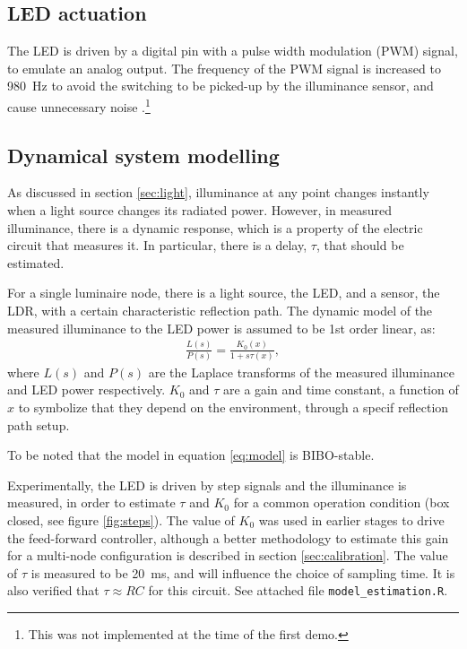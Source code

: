 \documentclass[english,fira]{ist-report}
\begin{document}
\subsection{LED actuation}

The LED is driven by a digital pin with a pulse width modulation (PWM) signal, to emulate an analog output.
The frequency of the PWM signal is increased to \SI{980}{\hertz} to avoid the switching to be picked-up by the illuminance sensor, and cause unnecessary noise \cite{pwm-guide}.\footnote{This was not implemented at the time of the first demo.}

\subsection{Dynamical system modelling}

As discussed in section \ref{sec:light}, illuminance at any point changes instantly when a light source changes its radiated power.
However, in measured illuminance, there is a dynamic response, which is a property of the electric circuit that measures it. 
In particular, there is a delay, $\tau$, that should be estimated.

For a single luminaire node, there is a light source, the LED, and a sensor, the LDR, with a certain characteristic reflection path. The dynamic model of the measured illuminance to the LED power is assumed to be 1st order linear, as:
\begin{align}
    \frac{L(s)}{P(s)} = \frac{K_0(x)}{1+s\tau(x)},
\end{align}
where $L(s)$ and $P(s)$ are the Laplace transforms of the measured illuminance and LED power respectively. $K_0$ and $\tau$ are a gain and time constant, a function of $x$ to symbolize that they depend on the environment, through a specif reflection path setup.

To be noted that the model in equation \ref{eq:model} is BIBO-stable.

Experimentally, the LED is driven by step signals and the illuminance is measured, in order to estimate $\tau$ and $K_0$ for a common operation condition (box closed, see figure \ref{fig:steps}). The value of $K_0$ was used in earlier stages to drive the feed-forward controller, although a better methodology to estimate this gain for a multi-node configuration is described in section \ref{sec:calibration}. The value of $\tau$ is measured to be \SI{20}{\milli\second}, and will influence the choice of sampling time. It is also verified that $\tau \approx RC$ for this circuit. See attached file \texttt{model\_estimation.R}.
\end{document}
